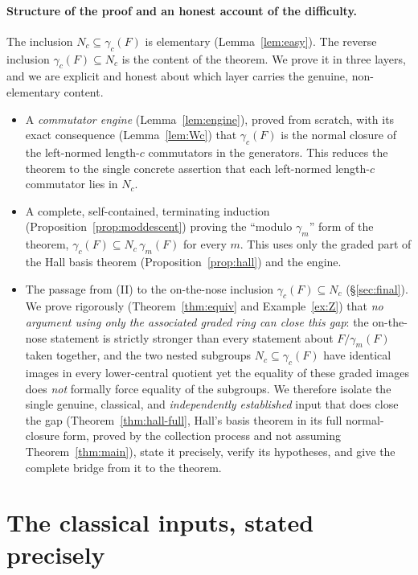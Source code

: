 \documentclass{amsart}
\theoremstyle{definition}
\theoremstyle{remark}
\begin{document}
\paragraph{Structure of the proof and an honest account of the difficulty.}
The inclusion $N_c\subseteq\gamma_c(F)$ is elementary (Lemma~\ref{lem:easy}). The
reverse inclusion $\gamma_c(F)\subseteq N_c$ is the content of the theorem. We
prove it in three layers, and we are explicit and honest about which layer carries
the genuine, non-elementary content.
\begin{itemize}
\item[(I)] A \emph{commutator engine} (Lemma~\ref{lem:engine}), proved from
scratch, with its exact consequence (Lemma~\ref{lem:Wc}) that $\gamma_c(F)$ is the
normal closure of the left-normed length-$c$ commutators in the generators. This
reduces the theorem to the single concrete assertion that each left-normed
length-$c$ commutator lies in $N_c$.
\item[(II)] A complete, self-contained, terminating induction
(Proposition~\ref{prop:moddescent}) proving the ``modulo $\gamma_m$'' form of the
theorem, $\gamma_c(F)\subseteq N_c\,\gamma_m(F)$ for every $m$. This uses only the
graded part of the Hall basis theorem (Proposition~\ref{prop:hall}) and the
engine.
\item[(III)] The passage from (II) to the on-the-nose inclusion
$\gamma_c(F)\subseteq N_c$ (\S\ref{sec:final}). We prove rigorously
(Theorem~\ref{thm:equiv} and Example~\ref{ex:Z}) that \emph{no argument using only
the associated graded ring can close this gap}: the on-the-nose statement is
strictly stronger than every statement about $F/\gamma_m(F)$ taken together, and
the two nested subgroups $N_c\subseteq\gamma_c(F)$ have identical images in every
lower-central quotient yet the equality of these graded images does \emph{not}
formally force equality of the subgroups. We therefore isolate the single genuine,
classical, and \emph{independently established} input that does close the gap
(Theorem~\ref{thm:hall-full}, Hall's basis theorem in its full normal-closure
form, proved by the collection process and not assuming
Theorem~\ref{thm:main}), state it precisely, verify its hypotheses, and give the
complete bridge from it to the theorem.
\end{itemize}

\section{The classical inputs, stated precisely}\label{sec:input}
\end{document}
